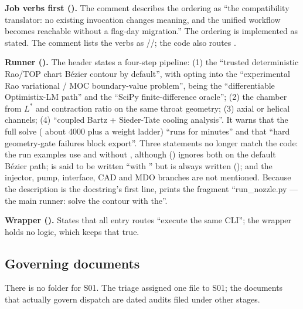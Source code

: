 \textbf{Job verbs first ().} The comment describes the ordering as ``the compatibility translator: no existing invocation changes meaning, and the unified workflow becomes reachable without a flag-day migration.'' The ordering is implemented as stated. The comment lists the verbs as //; the code also routes .

\textbf{Runner ().} The header states a four-step pipeline: (1) the ``trusted deterministic Rao/TOP chart B\'ezier contour by default'', with   opting into the ``experimental Rao variational / MOC boundary-value problem'',   being the ``differentiable Optimistix-LM path'' and   the ``SciPy finite-difference oracle''; (2) the chamber from $L^{*}$ and contraction ratio on the same throat geometry; (3)  axial or helical channels; (4)  ``coupled Bartz + Sieder-Tate cooling analysis''. It warns that the full    solve ( about 4000 plus a weight ladder) ``runs for minutes'' and that ``hard geometry-gate failures block export''. Three statements no longer match the code: the run examples use   and   without  , although  () ignores both on the default B\'ezier path;  is said to be written ``with '' but is always written (); and the injector, pump, interface, CAD and MDO branches are not mentioned. Because the  description is the docstring's first line,   prints the fragment ``run\_nozzle.py --- the main runner: solve the contour with the''.

\textbf{Wrapper ().} States that all entry routes ``execute the same CLI''; the wrapper holds no logic, which keeps that true.

\subsection{Governing documents}\label{sec:s01-docs}

There is no  folder for S01. The triage assigned one file to S01; the documents that actually govern dispatch are dated audits filed under other stages.

